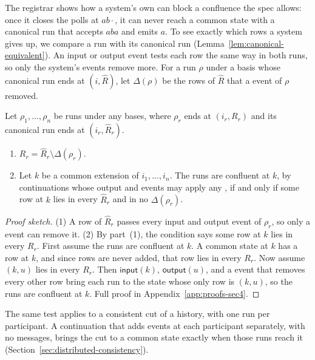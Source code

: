 The registrar shows how a system's own \commitment can block a confluence the
spec allows: once it closes the polls at $ab\cdot$, it can never reach a common
state with a canonical run that accepts $aba$ and emits $a$.  To see exactly
which rows a system gives up, we compare a run with its canonical run
(Lemma~\ref{lem:canonical-equivalent}).  An input or output event tests each
row the same way in both runs, so only the system's \commitment events remove
more.  For a run $\rho$ under a basis whose canonical run ends at
$(i,\widehat R)$, let $\Delta(\rho)$ be the rows of $\widehat R$ that a
\commitment event of $\rho$ removed.

\begin{proposition}
\label{prop:system-confluence}
Let $\rho_1,\ldots,\rho_n$ be runs under any \commitment bases, where $\rho_r$
ends at $(i_r,R_r)$ and its canonical run ends at $(i_r,\widehat R_r)$.
\begin{enumerate}
  \item $R_r=\widehat R_r\setminus\Delta(\rho_r)$.
  \item Let $k$ be a common extension of $i_1,\ldots,i_n$.  The runs are
        confluent at $k$, by continuations whose output and \commitment events
        may apply any \commitments, if and only if some row at $k$ lies in
        every $\widehat R_r$ and in no $\Delta(\rho_r)$.
\end{enumerate}
\end{proposition}

\begin{proof}[Proof sketch]
(1) A row of $\widehat R_r$ passes every input and output event of $\rho_r$,
so only a \commitment event can remove it.  (2) By part~(1), the condition says
some row at $k$ lies in every $R_r$.  First assume the runs are confluent at
$k$.  A common state at $k$ has a row at $k$, and since rows are never added,
that row lies in every $R_r$.  Now assume $(k,u)$ lies in every $R_r$.  Then
$\mathsf{input}(k)$, $\mathsf{output}(u)$, and a \commitment event that removes
every other row bring each run to the state whose only row is $(k,u)$, so the
runs are confluent at $k$.  Full proof in Appendix~\ref{app:proofs-sec4}.
\end{proof}

The same test applies to a consistent cut of a history, with one run per
participant.  A continuation that adds events at each participant separately,
with no messages, brings the cut to a common state exactly when those runs
reach it (Section~\ref{sec:distributed-consistency}).

